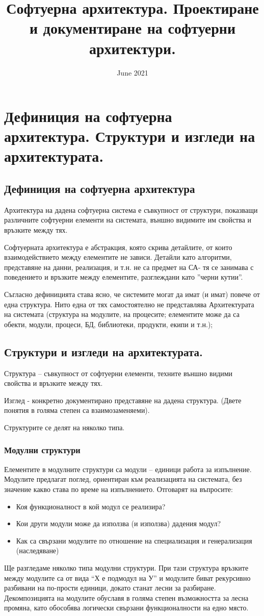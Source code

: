 \documentclass[fleqn,12pt]{article}
\title{Софтуерна архитектура. Проектиране и документиране на софтуерни
архитектури.}
\date{June 2021}
\makeatletter
\newcommand\subsubsubsection{\@startsection{paragraph}{4}{\z@}{-2.5ex\@plus -1ex \@minus -.25ex}{1.25ex \@plus .25ex}{\normalfont\normalsize\bfseries}}
\makeatother
\begin{document}
\maketitle 

\section{Дефиниция на софтуерна архитектура. Структури и изгледи  на архитектурата.}
\subsection{Дефиниция на софтуерна архитектура}
Архитектура на дадена софтуерна система е съвкупност от структури, показващи различните софтуерни елементи на системата, външно видимите им свойства и връзките между тях.

Софтуерната архитектура е абстракция, която скрива
детайлите, от които взаимодействието между елементите не зависи. Детайли като алгоритми, представяне на данни, реализация, и т.н. не са
предмет на СА- тя се занимава с поведението и връзките между елементите, разглеждани като ''черни кутии''.

Съгласно дефиницията става ясно, че системите могат да имат (и имат)
повече от една структура. Нито една от тях самостоятелно не
представлява Архитектурата на системата (структура на модулите, на
процесите; елементите може да са обекти, модули, процеси, БД,
библиотеки, продукти, екипи и т.н.);
\subsection{Структури и изгледи на архитектурата. }
Структура – съвкупност от софтуерни елементи, техните външно видими свойства и връзките между тях.

Изглед - конкретно документирано представяне на дадена структура. (Двете понятия в голяма степен са взаимозаменяеми).

Структурите се делят на няколко типа.
\subsubsection{Модулни структури}
Елементите в модулните структури са модули – единици работа за изпълнение. Модулите предлагат поглед, ориентиран към реализацията на системата, без значение какво става по време на изпълнението.
Отговарят на въпросите:
\begin {itemize}
\item Коя функционалност в кой модул се реализира? 
\item Кои други модули може да използва (и използва) дадения модул? 
\item Как са свързани модулите по отношение на специализация и генерализация (наследяване)
\end {itemize}
Ще разгледаме няколко типа модулни структури.
\subsubsubsection{ Декомпозиция на модулите}
При тази структура връзките между модулите са от вида “Х е подмодул на У” и модулите биват рекурсивно разбивани на по-прости единици, докато станат лесни за разбиране. Декомпозицията на модулите обуславя в голяма степен възможността за лесна промяна, като обособява логически свързани функционалности на едно място.
\end{document}
